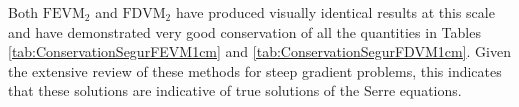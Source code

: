 Both $\text{FEVM}_2$ and $\text{FDVM}_2$ have produced visually identical results at this scale and have demonstrated very good conservation of all the quantities in Tables \ref{tab:ConservationSegurFEVM1cm} and \ref{tab:ConservationSegurFDVM1cm}. Given the extensive review of these methods \cite{Pitt-2018-61} for steep gradient problems, this indicates that these solutions are indicative of true solutions of the Serre equations.





